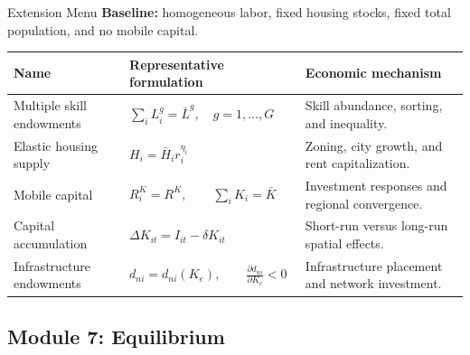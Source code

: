 \documentclass[aspectratio=169,11pt]{beamer}
\newcommand{\B}[1]{\textcolor{blue1}{\textbf{#1}}}
\begin{document}
\begin{frame}{Extension Menu}
  \scriptsize
  \setlength{\tabcolsep}{3pt}
  \B{Baseline:} homogeneous labor, fixed housing stocks, fixed total
  population, and no mobile capital.

  \smallskip
  \renewcommand{\arraystretch}{1.08}
  \begin{center}
  \begin{tabular}{
    >{\raggedright\arraybackslash}p{}
    >{\centering\arraybackslash}p{}
    >{\raggedright\arraybackslash}p{}}
    \toprule
    Name & Representative formulation & Economic mechanism \\
    \midrule
    Multiple skill endowments
      & \(\displaystyle \sum_iL_i^g=\bar L^g,\quad g=1,\ldots,G\)
      & Skill abundance, sorting, and inequality. \\
    \addlinespace[1pt]
    Elastic housing supply
      & \(\displaystyle H_i=\bar H_i r_i^{\eta_i}\)
      & Zoning, city growth, and rent capitalization. \\
    \addlinespace[1pt]
    Mobile capital
      & \(\displaystyle R_i^K=R^K,\qquad\sum_iK_i=\bar K\)
      & Investment responses and regional convergence. \\
    \addlinespace[1pt]
    Capital accumulation
      & \(\displaystyle \Delta K_{it}=I_{it}-\delta K_{it}\)
      & Short-run versus long-run spatial effects. \\
    \addlinespace[1pt]
    Infrastructure endowments
      & \(\displaystyle
          d_{ni}=d_{ni}(K_e),\qquad
          \frac{\partial d_{ni}}{\partial K_e}<0\)
      & Infrastructure placement and network investment. \\
    \bottomrule
  \end{tabular}
  \end{center}
\end{frame}

\subsection{Module 7: Equilibrium}
\end{document}
